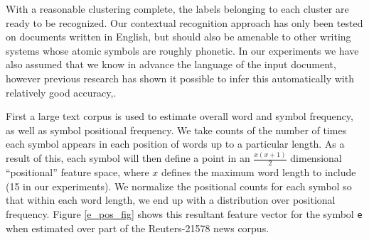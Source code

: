 \documentclass[times, 10pt,twocolumn]{article}
\begin{document}

With a reasonable clustering complete, the labels belonging to each cluster are
ready to be recognized.  Our contextual recognition approach has only been
tested on documents written in English, but should also be amenable to other
writing systems whose atomic symbols are roughly phonetic.  In our experiments
we have also assumed that we know in advance the language of the
input document, however previous research has shown it possible to infer this
automatically with relatively good accuracy\cite{sibun1994},\cite{hochberg1997}.

First a large text corpus is used to estimate overall word and symbol frequency,
as well as symbol positional frequency.  We take counts of the number of times
each symbol appears in each position of words up to a particular length.  As
a result of this, each symbol will then define a point in an $\frac{x
(x+1)}{2}$ dimensional ``positional'' feature space, where $x$ defines the
maximum word length to include (15 in our experiments).  We normalize the
positional counts for each symbol so that within each word length, we end up
with a distribution over positional frequency.  Figure \ref{e_pos_fig} shows
this resultant feature vector for the symbol {\tt e} when estimated over part of
the Reuters-21578 news corpus\cite{lewis2004}.
\end{document}
